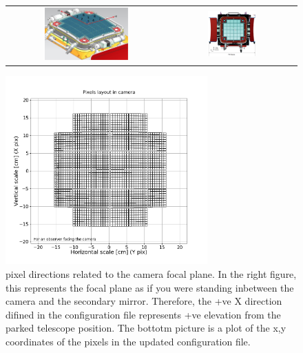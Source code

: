 \documentclass[GCT,short]{gct}
\begin{document}
\begin{figure}
\centering
\begin{tabular}{cc}
\includegraphics[width=0.55\textwidth]{../02_cameraConfigFile/Picture1.png} & \includegraphics[width=0.40\textwidth]{../02_cameraConfigFile/Picture2.png}  \\
\end{tabular}
\includegraphics[width=0.69\textwidth]{../02_cameraConfigFile/camera_pixel_layout.png} 
\caption{pixel directions related to the camera focal plane. In the right figure, this represents the focal plane as if you were standing inbetween the camera and the secondary mirror. Therefore, the +ve X direction difined in the configuration file represents +ve elevation from the parked telescope position. The bottotm picture is a plot of the x,y coordinates of the pixels in the updated configuration file.}
\label{fig:focalplane-pixels}
\end{figure}
\end{document}
